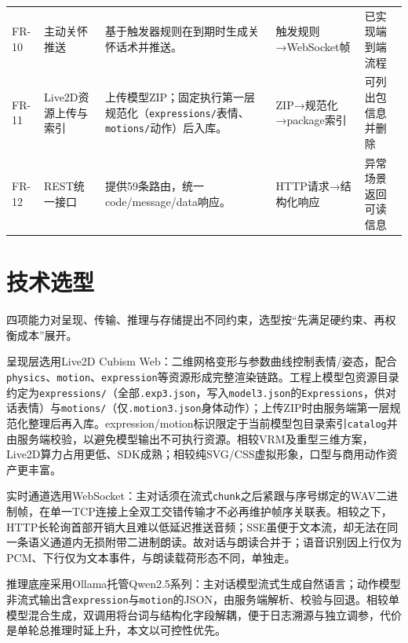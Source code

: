 \documentclass{base}
\begin{document}
\begin{table}[H]
\begin{tabularx}{\textwidth}{@{} >{\raggedright\arraybackslash}p{1.15cm} >{\raggedright\arraybackslash}p{2.35cm} Y >{\raggedright\arraybackslash}p{3.55cm} Y @{}}
        FR-10       & 主动关怀推送        & 基于触发器规则在到期时生成关怀话术并推送。                      & 触发规则→WebSocket帧                                  & 已实现端到端流程        \\
        FR-11       & Live2D资源上传与索引 & 上传模型ZIP；固定执行第一层规范化（\texttt{expressions/}表情、\texttt{motions/}动作）后入库。 & ZIP→规范化→package索引                              & 可列出包信息并删除       \\
        FR-12       & REST统一接口      & 提供59条路由，统一code/message/data响应。 & HTTP请求→结构化响应                                     & 异常场景返回可读信息      \\
        \bottomrule
    \end{tabularx}
    \endgroup
\end{table}

\section{技术选型}

四项能力对呈现、传输、推理与存储提出不同约束，选型按``先满足硬约束、再权衡成本''展开。

呈现层选用Live2D Cubism Web：二维网格变形与参数曲线控制表情/姿态，配合\texttt{physics}、\texttt{motion}、\texttt{expression}等资源形成完整渲染链路\cite{live2d}。工程上模型包资源目录约定为\texttt{expressions/}（全部\texttt{.exp3.json}，写入\texttt{model3.json}的\texttt{Expressions}，供对话表情）与\texttt{motions/}（仅\texttt{.motion3.json}身体动作）；上传ZIP时由服务端第一层规范化整理后再入库。expression/motion标识限定于当前模型包目录索引\texttt{catalog}并由服务端校验，以避免模型输出不可执行资源。相较VRM及重型三维方案，Live2D算力占用更低、SDK成熟；相较纯SVG/CSS虚拟形象，口型与商用动作资产更丰富。

实时通道选用WebSocket：主对话须在流式\texttt{chunk}之后紧跟与序号绑定的WAV二进制帧，在单一TCP连接上全双工交错传输才不必再维护帧序关联表\cite{rfc6455,mdn-ws}。相较之下，HTTP长轮询首部开销大且难以低延迟推送音频；SSE虽便于文本流，却无法在同一条语义通道内无损附带二进制朗读。故对话与朗读合并于；语音识别因上行仅为PCM、下行仅为文本事件，与朗读载荷形态不同，单独走。

推理底座采用Ollama托管Qwen2.5系列\cite{ollama}：主对话模型流式生成自然语言；动作模型非流式输出含\texttt{expression}与\texttt{motion}的JSON，由服务端解析、校验与回退。相较单模型混合生成，双调用将台词与结构化字段解耦，便于日志溯源与独立调参，代价是单轮总推理时延上升，本文以可控性优先。
\end{document}
